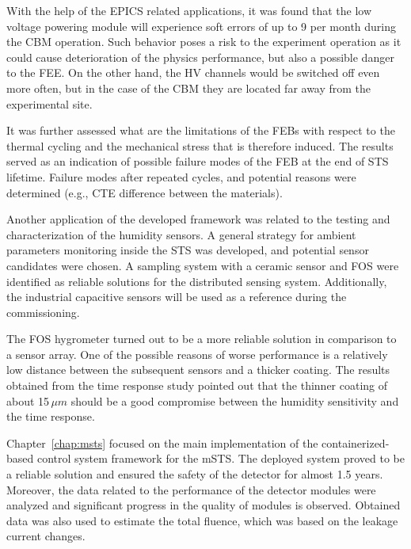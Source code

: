With the help of the \gls{EPICS} related applications, it was found that the low voltage powering module will experience soft errors of up to 9 per month during the \gls{CBM} operation. Such behavior poses a risk to the experiment operation as it could cause deterioration of the physics performance, but also a possible danger to the \gls{FEE}. On the other hand, the \gls{HV} channels would be switched off even more often, but in the case of the \gls{CBM} they are located far away from the experimental site.

It was further assessed what are the limitations of the \glspl{FEB} with respect to the thermal cycling and the mechanical stress that is therefore induced. The results served as an indication of possible failure modes of the \gls{FEB} at the end of \gls{STS} lifetime. Failure modes after repeated cycles, and potential reasons were determined (e.g., \gls{CTE} difference between the materials). 

Another application of the developed framework was related to the testing and characterization of the humidity sensors. A general strategy for ambient parameters monitoring inside the \gls{STS} was developed, and potential sensor candidates were chosen. A sampling system with a ceramic sensor and \gls{FOS} were identified as reliable solutions for the distributed sensing system. Additionally, the industrial capacitive sensors will be used as a reference during the commissioning.

The \gls{FOS} hygrometer turned out to be a more reliable solution in comparison to a sensor array. One of the possible reasons of  worse performance is a relatively low distance between the subsequent sensors and a thicker coating. The results obtained from the time response study pointed out that the thinner coating of about 15\,$\mu m$ should be a good compromise between the humidity sensitivity and the time response. 

Chapter~\ref{chap:msts} focused on the main implementation of the containerized-based control system framework for the \gls{mSTS}. The deployed system proved to be a reliable solution and ensured the safety of the detector for almost 1.5 years. Moreover, the data related to the performance of the detector modules were analyzed and significant progress in the quality of modules is observed. Obtained data was also used to estimate the total fluence, which was based on the leakage current changes. 


\newpage